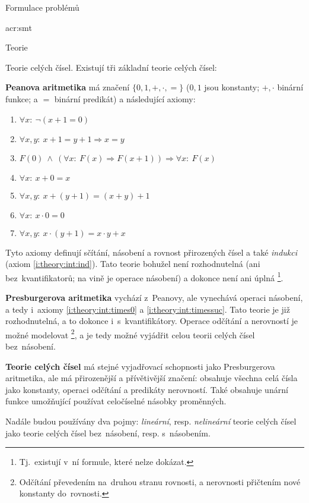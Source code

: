 \documentclass[thesis=M,czech]{FITthesis}[2012/06/26]
\newcommand{\acrlabel}[1]{acr:#1}
\newcommand{\acrf}[1]{\acrfull{\acrlabel{#1}}}
\newcommand{\hl}[1]{\textit{#1}}
\newcommand{\hll}[1]{\textbf{#1}}
\newcommand{\name}[1]{\hl{#1}}
\newcommand{\rf}[1]{\ref{#1}}
\begin{document}
\begin{section}{Formulace problémů}
\begin{subsection}{\acrf{smt}}
\begin{subsubsection}{Teorie}

\begin{paragraph}{Teorie celých čísel.}
\label{p:theory:formulation:smt:theory:int}
Existují tři základní teorie celých čísel:

\hll{Peanova aritmetika} má značení
$\{ {0, 1}, {+, \cdot}, = \}$
(${0,1}$ jsou konstanty;
${+,\cdot}$ binární funkce;
a $=$ binární predikát)
a následující axiomy:
\begin{enumerate}
\item $\forall x : \: \neg ( x + 1 = 0 )$
\item $\forall x,y : \: x+1 = y+1 \Rightarrow x = y$
\item \label{i:theory:int:ind}
   $F(0) \: \land \: \left( \forall x : \: F(x) \Rightarrow F(x+1) \right)
      \Rightarrow \forall x : \: F(x)$
\item $\forall x : \: x+0 = x$
\item $\forall x,y : \: x + (y+1) = (x+y) + 1$
\item \label{i:theory:int:times0}
   $\forall x : \: x \cdot 0 = 0$
\item \label{i:theory:int:timessuc}
   $\forall x,y : \: x \cdot (y+1) = x \cdot y + x$
\end{enumerate}
Tyto axiomy definují sčítání, násobení a rovnost
přirozených čísel a také \name{indukci}
(axiom \rf{i:theory:int:ind}).
Tato teorie bohužel není rozhodnutelná
(ani bez~kvantifikatorů;
na vině je operace násobení)
a dokonce není ani úplná%
\footnote{Tj.~existují v~ní formule, které nelze dokázat.}.

\hll{Presburgerova aritmetika} vychází z~Peanovy,
ale vynechává operaci násobení,
a tedy i~axiomy \rf{i:theory:int:times0} a \rf{i:theory:int:timessuc}.
Tato teorie je již rozhodnutelná,
a to dokonce i~s~kvantifikátory.
Operace odčítání a nerovností je možné modelovat%
\footnote{Odčítání převedením na~druhou stranu rovnosti,
a nerovnosti přičtením nové konstanty do~rovnosti.},
a je tedy možné vyjádřit celou teorii celých čísel
bez~násobení.

\hll{Teorie celých čísel} má stejné vyjadřovací schopnosti
jako Presburgerova aritmetika,
ale má přirozenější a přívětivější značení:
obsahuje všechna celá čísla jako konstanty,
operaci odčítání a predikáty nerovností.
Také obsahuje unární funkce
umožňující používat celočíselné násobky proměnných.

Nadále budou používány dva pojmy:
\hl{lineární}, resp. \hl{nelineární}
teorie celých čísel
jako teorie celých čísel bez~násobení,
resp. s~násobením.
\end{paragraph} %


\end{subsubsection}
\end{subsection}
\end{section}
\end{document}
